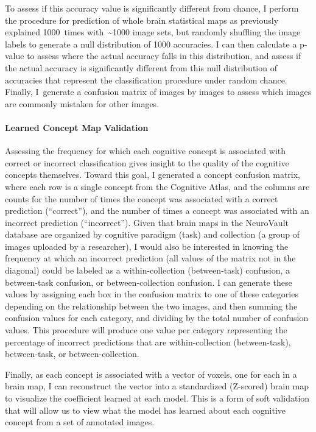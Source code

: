 \documentclass{report}
\begin{document}
To assess if this accuracy value is significantly different from chance,
I perform the procedure for prediction of whole brain statistical maps as previously explained 1000~times
with~\textasciitilde{}1000 image sets, but randomly
shuffling the image labels to generate a null distribution of 1000
accuracies. I can then calculate a p-value to assess where the actual accuracy falls in this distribution, and assess if the actual
accuracy is significantly different from this null distribution of
accuracies that represent the classification procedure under random
chance. Finally, I~generate a confusion matrix of images by images to
assess which images are commonly mistaken for other images.

\paragraph{Learned Concept Map Validation}

Assessing the frequency for which each cognitive concept is associated
with correct or incorrect classification gives insight to the quality of
the cognitive concepts themselves. Toward this goal, I generated a
concept confusion matrix, where each row is a single concept from the
Cognitive Atlas, and the columns are counts for the number of times the
concept was associated with a correct prediction (``correct''), and the
number of times a concept was associated with an incorrect prediction
(``incorrect''). Given that brain maps in the NeuroVault database are
organized by cognitive paradigm (task) and collection (a group of images
uploaded by a researcher), I would also be interested in knowing the
frequency at which an incorrect prediction (all values of the matrix not
in the diagonal) could be labeled as a within-collection (between-task)
confusion, a between-task confusion, or between-collection
confusion. I can generate these values by assigning each box in the confusion matrix to one of these categories depending on the relationship between the two images, and then summing the confusion values for each category, and
dividing by the total number of confusion values. This procedure will
produce one value per category representing the percentage of incorrect
predictions that are within-collection (between-task), between-task, or
between-collection.

Finally, as each concept is associated with a vector of voxels, one for
each in a brain map, I can reconstruct the vector into a standardized
(Z-scored) brain map to visualize the coefficient learned at each model.
This is a form of soft validation that will allow us to view what the
model has learned about each cognitive concept from a set of annotated
images.
\end{document}
